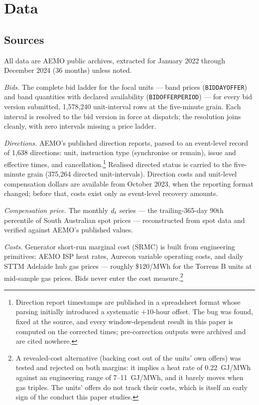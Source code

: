 \section{Data}\label{sec:data}

\subsection{Sources}

All data are AEMO public archives, extracted for January 2022 through December
2024 (36 months) unless noted.

\emph{Bids.} The complete bid ladder for the focal units --- band prices
(\texttt{BIDDAYOFFER}) and band quantities with declared availability
(\texttt{BIDOFFERPERIOD}) --- for every bid version submitted, 1,578,240
unit-interval rows at the five-minute grain. Each interval is resolved to the
bid version in force at dispatch; the resolution joins cleanly, with zero
intervals missing a price ladder.

\emph{Directions.} AEMO's published direction reports, parsed to an event-level
record of 1,638 directions: unit, instruction type (synchronise or remain),
issue and effective times, and cancellation.\footnote{Direction report
timestamps are published in a spreadsheet format whose parsing initially
introduced a systematic $+10$-hour offset. The bug was found, fixed at the
source, and every window-dependent result in this paper is computed on the
corrected times; pre-correction outputs were archived and are cited nowhere.}
Realised directed status is carried to the five-minute grain (375,264 directed
unit-intervals). Direction costs and unit-level compensation dollars are
available from October 2023, when the reporting format changed; before that,
costs exist only as event-level recovery amounts.

\emph{Compensation price.} The monthly $d_t$ series --- the trailing-365-day
90th percentile of South Australian spot prices --- reconstructed from spot
data and verified against AEMO's published values.

\emph{Costs.} Generator short-run marginal cost (SRMC) is built from
engineering primitives: AEMO ISP heat rates, Aurecon variable operating costs, and daily
STTM Adelaide hub gas prices --- roughly \$120/MWh for the Torrens B units at
mid-sample gas prices. Bids never enter the cost measure.\footnote{A
revealed-cost alternative (backing cost out of the units' own offers) was
tested and rejected on both margins: it implies a heat rate of 0.22~GJ/MWh
against an engineering range of 7--11~GJ/MWh, and it barely moves when gas
triples.
The units' offers do not track their costs, which is itself an early sign of
the conduct this paper studies.}

